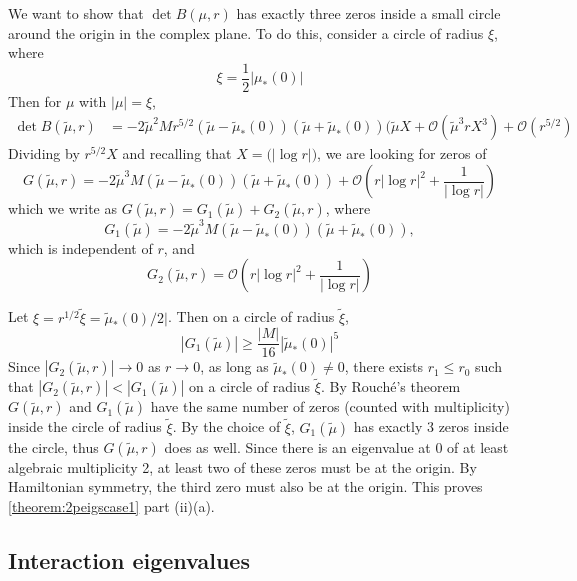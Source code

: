 \documentclass[thesis.tex]{subfiles}
\begin{document}
We want to show that $\det B(\mu, r)$ has exactly three zeros inside a small circle around the origin in the complex plane. To do this, consider a circle of radius $\xi$, where
\[
\xi = \frac{1}{2}|\mu_*(0)|
\]
Then for $\mu$ with $|\mu| = \xi$,
\begin{equation*}
\begin{aligned}
\det B(\tilde{\mu}, r) &= -2 \tilde{\mu}^2 M r^{5/2} (\tilde{\mu} - \tilde{\mu}_*(0)) (\tilde{\mu} + \tilde{\mu}_*(0))( \tilde{\mu} X + \mathcal{O}(\tilde{\mu}^3 r X^3) + \mathcal{O}( r^{5/2} )
\end{aligned}
\end{equation*}
Dividing by $r^{5/2}X$ and recalling that $X = \mathcal(|\log r|)$, we are looking for zeros of
\[
G(\tilde{\mu}, r) = -2 \tilde{\mu}^3 M (\tilde{\mu} - \tilde{\mu}_*(0)) (\tilde{\mu} + \tilde{\mu}_*(0)) + \mathcal{O}\left( r |\log r|^2 + \frac{1}{|\log r|} \right)
\]
which we write as $G(\tilde{\mu}, r) = G_1(\tilde{\mu}) + G_2(\tilde{\mu}, r)$, where 
\[
G_1(\tilde{\mu}) = -2 \tilde{\mu}^3 M (\tilde{\mu} - \tilde{\mu}_*(0)) (\tilde{\mu} + \tilde{\mu}_*(0)),
\]
which is independent of $r$, and
\[
G_2(\tilde{\mu}, r) = \mathcal{O}\left( r |\log r|^2 + \frac{1}{|\log r|} \right)
\]

Let $\xi = r^{1/2} \tilde{\xi} = \tilde{\mu}_*(0)/2|$. Then on a circle of radius $\tilde{\xi}$,
\[
|G_1(\tilde{\mu})| \geq \frac{|M|}{16}|\tilde{\mu}_*(0)|^5
\]
Since $|G_2(\tilde{\mu}, r)| \rightarrow 0$ as $r \rightarrow 0$, as long as $\tilde{\mu}_*(0) \neq 0$, there exists $r_1 \leq r_0$ such that $|G_2(\tilde{\mu}, r)| < |G_1(\tilde{\mu})|$ on a circle of radius $\tilde{\xi}$. By Rouch\'{e}'s theorem $G(\tilde{\mu}, r)$ and $G_1(\tilde{\mu})$ have the same number of zeros (counted with multiplicity) inside the circle of radius $\tilde{\xi}$. By the choice of $\tilde{\xi}$, $G_1(\tilde{\mu})$ has exactly 3 zeros inside the circle, thus $G(\tilde{\mu}, r)$ does as well. Since there is an eigenvalue at 0 of at least algebraic multiplicity 2, at least two of these zeros must be at the origin. By Hamiltonian symmetry, the third zero must also be at the origin. This proves \cref{theorem:2peigscase1} part (ii)(a).

\subsection{Interaction eigenvalues}
\end{document}
